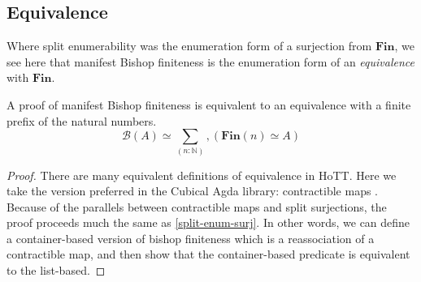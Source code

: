\subsection{Equivalence}
Where split enumerability was the enumeration form of a surjection from
\(\mathbf{Fin}\), we see here that manifest Bishop finiteness is the enumeration
form of an \emph{equivalence} with \(\mathbf{Fin}\).
\begin{rm-lemma} \label{bishop-equiv}
  A proof of manifest Bishop finiteness is equivalent to an equivalence with a
  finite prefix of the natural numbers.
  \begin{equation}
    \mathcal{B}(A) \simeq \sum_{(n : \mathbb{N})} , \left( \mathbf{Fin}(n) \simeq A \right)
  \end{equation}
\end{rm-lemma}
\begin{proof}
  There are many equivalent definitions of equivalence in HoTT.
  Here we take the version preferred in the Cubical Agda library: contractible
  maps \cite{hottbook}.
  Because of the parallels between contractible maps and split surjections,
  the proof proceeds much the same as \ref{split-enum-surj}.
  In other words, we can define a container-based version of bishop finiteness
  which is a reassociation of a contractible map, and then show that the
  container-based predicate is equivalent to the list-based.
\end{proof}
